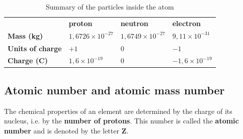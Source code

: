           \begin{table}[H]
        \begin{center}
      \label{m38745*uid14}
    \noindent
      \tablelasttail{}
      \begin{xtabular}[t]{|l|l|l|l|}\hline
         &
                    \textbf{proton}
                   &
                    \textbf{neutron}
                   &
                    \textbf{electron}
     \tabularnewline{}
                    \textbf{Mass (kg)}
                   &
        $1,6726\ensuremath{\times}{10}^{-27}$ &
        $1,6749\ensuremath{\times}{10}^{-27}$ &
        $9,11\ensuremath{\times}{10}^{-31}$%
     \tabularnewline{}
                    \textbf{Units of charge}
                   &
        $+1$ &
        $0$ &
        $-1$%
     \tabularnewline{}
                    \textbf{Charge (C)}
                   &
        $1,6\ensuremath{\times}{10}^{-19}$ &
        $0$ &
        $-1,6\ensuremath{\times}{10}^{-19}$%
     \tabularnewline{}
    \end{xtabular}
      \end{center}
    \caption{Summary of the particles inside the atom}
\end{table}
    \par
    \label{m38745*cid5}
            \subsection{ Atomic number and atomic mass number}
            \nopagebreak
      \label{m38745*id255805}The chemical properties of an element are determined by the charge of
its nucleus, i.e. by the \textbf{number of protons}. This number is
called the \textbf{atomic number} and is denoted by the letter \textbf{Z}.\par 


